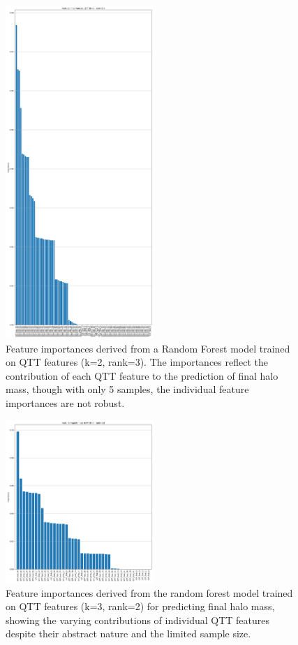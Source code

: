 \documentclass[twocolumn]{aastex631}
\begin{document}
\begin{figure}[h!]
    \centering
    \includegraphics[width=0.5\textwidth]{../input_files/plots/feature_importances_qtt_k2_r3_15_20250524-175150.png}
    \caption{Feature importances derived from a Random Forest model trained on QTT features (k=2, rank=3). The importances reflect the contribution of each QTT feature to the prediction of final halo mass, though with only 5 samples, the individual feature importances are not robust.
}
    \label{fig:feature_importances_qtt_k2_r3}
\end{figure}

\begin{figure}[h!]
    \centering
    \includegraphics[width=0.5\textwidth]{../input_files/plots/feature_importances_qtt_k3_r2_18_20250524-175150.png}
    \caption{Feature importances derived from the random forest model trained on QTT features (k=3, rank=2) for predicting final halo mass, showing the varying contributions of individual QTT features despite their abstract nature and the limited sample size.
}
    \label{fig:feature_importances_qtt_k3_r2}
\end{figure}
\end{document}
